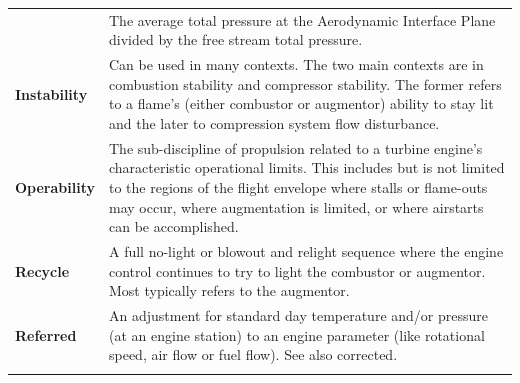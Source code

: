 \documentclass[
]{book}
\begin{document}
\begin{longtable}[]{@{}ll@{}}
\begin{minipage}[t]{0.24\columnwidth}
\end{minipage} & \begin{minipage}[t]{0.71\columnwidth}\raggedright
The average total pressure at the Aerodynamic Interface Plane divided by the free stream total pressure.\strut
\end{minipage}\tabularnewline
\begin{minipage}[t]{0.24\columnwidth}\raggedright
\textbf{Instability}\strut
\end{minipage} & \begin{minipage}[t]{0.71\columnwidth}\raggedright
Can be used in many contexts. The two main contexts are in combustion stability and compressor stability. The former refers to a flame's (either combustor or augmentor) ability to stay lit and the later to compression system flow disturbance.\strut
\end{minipage}\tabularnewline
\begin{minipage}[t]{0.24\columnwidth}\raggedright
\textbf{Operability}\strut
\end{minipage} & \begin{minipage}[t]{0.71\columnwidth}\raggedright
The sub-discipline of propulsion related to a turbine engine's characteristic operational limits. This includes but is not limited to the regions of the flight envelope where stalls or flame-outs may occur, where augmentation is limited, or where airstarts can be accomplished.\strut
\end{minipage}\tabularnewline
\begin{minipage}[t]{0.24\columnwidth}\raggedright
\textbf{Recycle}\strut
\end{minipage} & \begin{minipage}[t]{0.71\columnwidth}\raggedright
A full no-light or blowout and relight sequence where the engine control continues to try to light the combustor or augmentor. Most typically refers to the augmentor.\strut
\end{minipage}\tabularnewline
\begin{minipage}[t]{0.24\columnwidth}\raggedright
\textbf{Referred}\strut
\end{minipage} & \begin{minipage}[t]{0.71\columnwidth}\raggedright
An adjustment for standard day temperature and/or pressure (at an engine station) to an engine parameter (like rotational speed, air flow or fuel flow). See also corrected.\strut
\end{minipage}\tabularnewline
\begin{minipage}[t]{0.24\columnwidth}\raggedright

\end{minipage}
\end{longtable}
\end{document}
